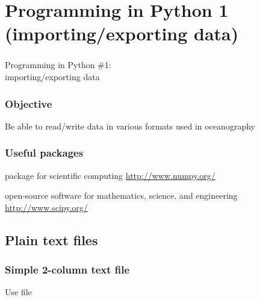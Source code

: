 \section{Programming in Python 1 (importing/exporting data)}

{
\begin{frame}
\frametitle{}
{\fontsize{50}{60}\selectfont Programming in Python \#1:\\
importing/exporting data} 

\end{frame}
}

\begin{frame}
\frametitle{Objective}

Be able to read/write data in various formats used in oceanography

\vfill 


\end{frame}

\begin{frame}
\frametitle{Useful packages}

\begin{description}
\item<1->[NumPy:] package for scientific computing \url{http://www.numpy.org/}
\item<2->[SciPy:] open-source software for mathematics, science, and engineering \url{http://www.scipy.org/}

\end{description}
\end{frame}

\subsection{Plain text files}
\begin{frame}[fragile]
\frametitle{Simple 2-column text file}
Use file 

\end{frame}


